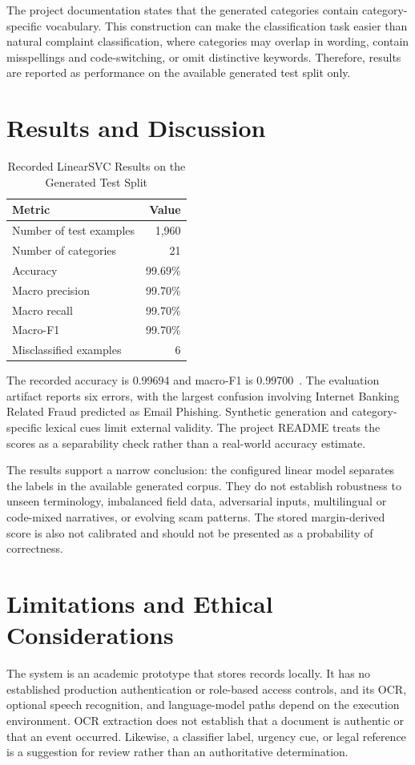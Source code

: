 \documentclass[conference]{IEEEtran}
\begin{document}
The project documentation states that the generated categories contain category-specific vocabulary. This construction can make the classification task easier than natural complaint classification, where categories may overlap in wording, contain misspellings and code-switching, or omit distinctive keywords. Therefore, results are reported as performance on the available generated test split only.

\section{Results and Discussion}
\begin{table}[t]
\caption{Recorded LinearSVC Results on the Generated Test Split}
\label{tab:results}
\centering
\begin{tabular}{lr}
\toprule
Metric & Value \\
\midrule
Number of test examples & 1,960 \\
Number of categories & 21 \\
Accuracy & 99.69\% \\
Macro precision & 99.70\% \\
Macro recall & 99.70\% \\
Macro-F1 & 99.70\% \\
Misclassified examples & 6 \\
\bottomrule
\end{tabular}
\end{table}

The recorded accuracy is 0.99694 and macro-F1 is 0.99700~\cite{projectArtifacts}. The evaluation artifact reports six errors, with the largest confusion involving Internet Banking Related Fraud predicted as Email Phishing. Synthetic generation and category-specific lexical cues limit external validity. The project README treats the scores as a separability check rather than a real-world accuracy estimate.

The results support a narrow conclusion: the configured linear model separates the labels in the available generated corpus. They do not establish robustness to unseen terminology, imbalanced field data, adversarial inputs, multilingual or code-mixed narratives, or evolving scam patterns. The stored margin-derived score is also not calibrated and should not be presented as a probability of correctness.

\section{Limitations and Ethical Considerations}
The system is an academic prototype that stores records locally. It has no established production authentication or role-based access controls, and its OCR, optional speech recognition, and language-model paths depend on the execution environment. OCR extraction does not establish that a document is authentic or that an event occurred. Likewise, a classifier label, urgency cue, or legal reference is a suggestion for review rather than an authoritative determination.
\end{document}
